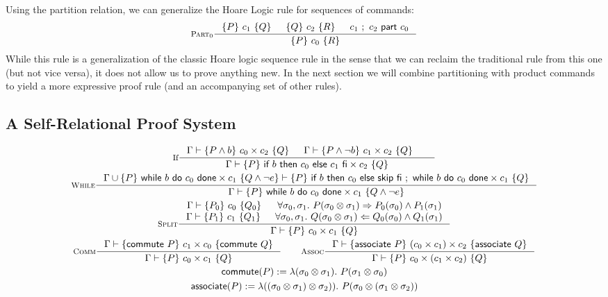 \documentclass[p.tex]{subfiles}
\begin{document}
Using the partition relation, we can generalize the Hoare Logic rule
for sequences of commands:
\begin{align*}
  \inference[$\textsc{Part}_0$]{%
    \hoare{P}{c_1}{Q}&
    \hoare{Q}{c_2}{R}&
    \relpart{c_1}{c_2}{c_0}
  }{%
    \hoare{P}{c_0}{R}
  }
\end{align*}
While this rule is a generalization of the classic Hoare logic
sequence rule in the sense that we can reclaim the traditional rule
from this one (but not vice versa), it does not allow us to prove
anything new. In the next section we will combine partitioning with
product commands to yield a more expressive proof rule (and
an accompanying set of other rules).

\subsection{A Self-Relational Proof System}
\begin{figure}
\begin{spreadlines}{5pt}
\begin{gather*}
  \inference[If]{%
    \judgement{\Gamma}{P \land b}{c_0 \times c_2}{Q}&
    \judgement{\Gamma}{P \land \neg b}{c_1 \times c_2}{Q}&
  }{%
    \judgement{\Gamma}{P}{\cprod{\cif{b}{c_0}{c_1}}{c_2}}{Q}
  }
  \\
  \inference[$\textsc{While}$]{%
    \judgement{%
      \Gamma \cup \hoare{P}{\cwhile{b}{c_0} \times c_1}{Q \land \neg e}
    }{P}{\cif{b}{c_0}{\cskip}~;~\cwhile{b}{c_0} \times c_1}{Q}
  }{%
    \judgement{\Gamma}{P}{\cwhile{b}{c_0} \times c_1}{Q \land \neg e}
  }
  \\
  \inference[\textsc{Split}]{%
    \judgement{\Gamma}{P_0}{c_0}{Q_0}&
    \forall \sigma_0, \sigma_1.~P(\sigma_0 \otimes \sigma_1) \Rightarrow
      P_0(\sigma_0) \land P_1(\sigma_1)\\
    \judgement{\Gamma}{P_1}{c_1}{Q_1}&
    \forall \sigma_0, \sigma_1.~Q(\sigma_0 \otimes \sigma_1) \Leftarrow
      Q_0(\sigma_0) \land Q_1(\sigma_1)\\
  }{%
    \judgement{\Gamma}{P}{c_0 \times c_1}{Q}
  }
  \\
  \inference[\textsc{Comm}]{%
    \judgement{\Gamma}{\commute~P}{c_1 \times c_0}{\commute~Q}
  }{%
    \judgement{\Gamma}{P}{c_0 \times c_1}{Q}
  }
  \qquad
  \inference[\textsc{Assoc}]{%
    \judgement{\Gamma}{\associate~P}{(c_0 \times c_1) \times c_2}{\associate~Q}
  }{%
    \judgement{\Gamma}{P}{c_0 \times (c_1 \times c_2)}{Q}
  }
  \\
  \commute(P) := \lambda(\sigma_0 \otimes \sigma_1).~P(\sigma_1 \otimes \sigma_0)\\
  \associate(P) := \lambda((\sigma_0 \otimes \sigma_1) \otimes
  \sigma_2)).~P(\sigma_0 \otimes (\sigma_1 \otimes \sigma_2))
\end{gather*}
\end{spreadlines}
\caption{}\label{fig:proof-system}
\end{figure}
\end{document}
